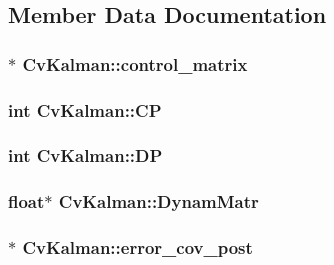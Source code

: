 \subsection{Member Data Documentation}
\hypertarget{structCvKalman_a4ed646de106c90cdee32abb0d0647b77}{
\subsubsection[{control\-\_\-matrix}]{$\ast$ Cv\-Kalman\-::control\-\_\-matrix}}\label{structCvKalman_a4ed646de106c90cdee32abb0d0647b77}
\hypertarget{structCvKalman_a0a505ce26c5a6e310cd37f1694c2f782}{
\subsubsection[{C\-P}]{\setlength{\rightskip}{0pt plus 5cm}int Cv\-Kalman\-::\-C\-P}}\label{structCvKalman_a0a505ce26c5a6e310cd37f1694c2f782}
\hypertarget{structCvKalman_a0202618820441a41c5188efddae52a43}{
\subsubsection[{D\-P}]{\setlength{\rightskip}{0pt plus 5cm}int Cv\-Kalman\-::\-D\-P}}\label{structCvKalman_a0202618820441a41c5188efddae52a43}
\hypertarget{structCvKalman_ae45757e0a85d1f1af2f3fa61850fc067}{
\subsubsection[{Dynam\-Matr}]{\setlength{\rightskip}{0pt plus 5cm}float$\ast$ Cv\-Kalman\-::\-Dynam\-Matr}}\label{structCvKalman_ae45757e0a85d1f1af2f3fa61850fc067}
\hypertarget{structCvKalman_af4f76ef05f89ffce977a35e731d9a329}{
\subsubsection[{error\-\_\-cov\-\_\-post}]{$\ast$ Cv\-Kalman\-::error\-\_\-cov\-\_\-post}}\label{structCvKalman_af4f76ef05f89ffce977a35e731d9a329}
